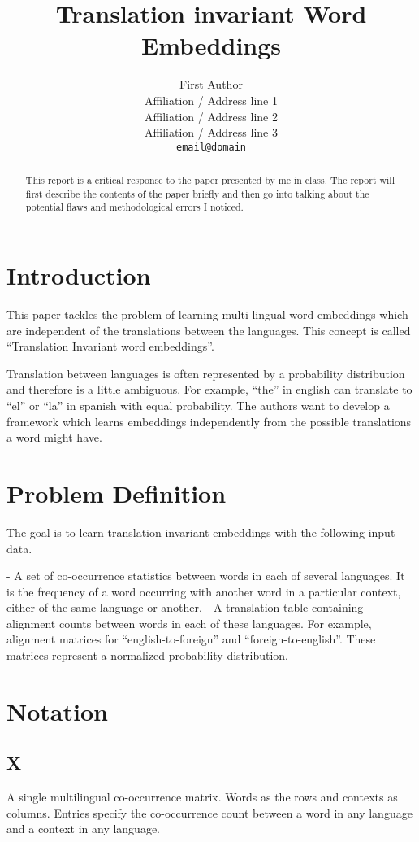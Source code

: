 \documentclass[11pt]{article}
\title{Translation invariant Word Embeddings}
\author{First Author \\
  Affiliation / Address line 1 \\
  Affiliation / Address line 2 \\
  Affiliation / Address line 3 \\
  {\tt email@domain}}
\date{}
\begin{document}
\maketitle
\begin{abstract}
This report is a critical response to the paper \cite{huang2015translation} presented by me in class. The report will first describe the contents of the paper briefly and then go into talking about the potential flaws and methodological errors I noticed.
\end{abstract}

\section{Introduction}
This paper tackles the problem of learning multi lingual word embeddings which are independent of the translations between the languages.  This concept is called “Translation Invariant word embeddings”.

Translation between languages is often represented by a probability distribution and therefore is a little ambiguous. For example, “the” in english can translate to “el” or “la” in spanish with equal probability. The authors want to develop a framework which learns embeddings independently from the possible translations a word might have.

\section{Problem Definition}
The goal is to learn translation invariant embeddings with the following input data.

- A set of co-occurrence statistics between words in each of several languages. It is the frequency of a word occurring with another word in a particular context, either of the same language or another. 
- A translation table containing alignment counts between words in each of these languages. For example, alignment matrices for “english-to-foreign” and “foreign-to-english”. These matrices represent a normalized probability distribution.

\section{Notation}

\subsection{X}
A single multilingual co-occurrence matrix.
Words as the rows and contexts as columns.
Entries specify the co-occurrence count between a word in any language and a context in any language.
\end{document}
